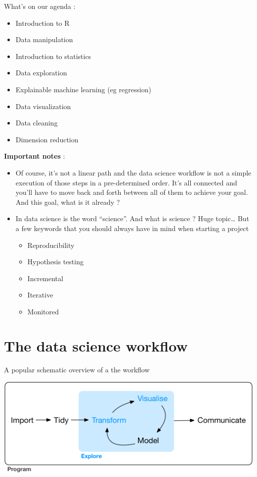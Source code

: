 \documentclass[
]{book}
\providecommand{\tightlist}{%
  \setlength{\itemsep}{0pt}\setlength{\parskip}{0pt}}
\begin{document}
What's on our agenda :

\begin{itemize}
\tightlist
\item
  Introduction to R
\item
  Data manipulation
\item
  Introduction to statistics
\item
  Data exploration
\item
  Explainable machine learning (eg regression)
\item
  Data visualization
\item
  Data cleaning
\item
  Dimension reduction
\end{itemize}

\textbf{Important notes} :

\begin{itemize}
\tightlist
\item
  Of course, it's not a linear path and the data science workflow is not a simple execution of those steps in a pre-determined order. It's all connected and you'll have to move back and forth between all of them to achieve your goal. And this goal, what is it already ?
\item
  In data science is the word ``science''. And what is science ? Huge topic\ldots{} But a few keywords that you should always have in mind when starting a project

  \begin{itemize}
  \tightlist
  \item
    Reproducibility
  \item
    Hypothesis testing
  \item
    Incremental
  \item
    Iterative
  \item
    Monitored
  \end{itemize}
\end{itemize}

\hypertarget{the-data-science-workflow}{%
\section{The data science workflow}\label{the-data-science-workflow}}

A popular schematic overview of a the workflow

\includegraphics{img/data-science-explore.png}
\end{document}
